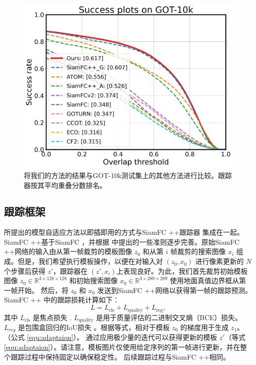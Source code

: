 \begin{figure}[t]
    \centering
    \includegraphics[width=1.0\textwidth]{Img/MTP/got10k/success_plot.png}
    \caption{将我们的方法的结果与GOT-10k测试集上的其他方法进行比较。跟踪器按其平均重叠分数排名。}
    \label{fig:got10k}
\end{figure}

\subsection{跟踪框架}
所提出的模型自适应方法以即插即用的方式与SiamFC ++跟踪器 \cite{SiamFC++} 集成在一起。 SiamFC ++基于SiamFC \cite{SiamFC} ，并根据 \cite{SiamFC++}中提出的一些准则逐步完善。原始SiamFC ++网络的输入由从第一帧裁剪的模板图像 $z_0$ 和从第 $i$ 帧裁剪的搜索图像 $x_i$ 组成。但是，我们希望执行模板操作，以便在对输入对 $(z_0, x_0)$ 进行像素更新的 $N$ 个步骤后获得 $z'$，跟踪器在 $(z', x_i)$上表现良好。为此，我们首先裁剪初始模板图像 $z_0\in\mathbb R^{3\times128\times 128}$ 和初始搜索图像 $x_0\in\mathbb R^{3\times289\times 289}$ 使用地面真值边界框从第一帧开始。
然后，将 $z_0$ 和 $x_0$ 发送到SiamFC ++网络以获得第一帧的跟踪预测。 SiamFC ++ \cite{SiamFC++} 中的跟踪损耗计算如下：
\begin{equation}
    L = L_{\text{cls}} + L_{\text{quality}} + L_{\text{reg}},
\end{equation}
其中 $L_{\text{cls}}$ 是焦点损失 \cite{focal}. $L_{\text{quality}}$ 是用于质量评估的二进制交叉熵（BCE）损失。 $L_{reg}$ 是包围盒回归的IoU损失 \cite{yu2016unitbox} 。根据等式，相对于模板 $z_0$ 的梯度用于生成 $z_1$。 （公式 \ref{equ:adaptaion}）。 通过应用极少量的迭代可以获得更新的模板 $z'$（等式 \ref{equ:adaptaion}）。请注意，模板图片仅使用给定序列的第一帧进行更新，并在整个跟踪过程中保持固定以确保稳定性。
后续跟踪过程与SiamFC ++相同。

